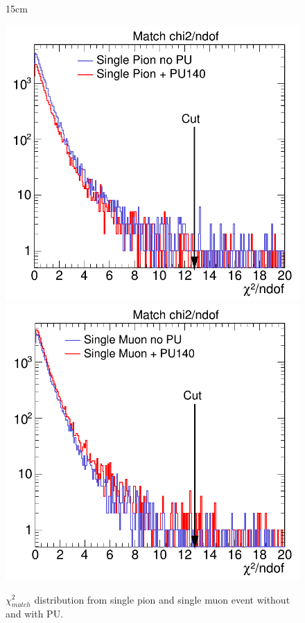 \begin{figure}[htbp]{15cm}
	\caption{$\chi^{2}_{match}$ distribution from single pion and single muon event without and with PU.}
	\centering
	\includegraphics[scale=0.23]{AppendixCMSL1TT/figs/chi2_ndof_single_pion_nopu_pu140}
	\includegraphics[scale=0.23]{AppendixCMSL1TT/figs/chi2_ndof_single_muon_nopu_pu140}
	\label{fig:match_chi2_pion_muon_distribution}
\end{figure}

